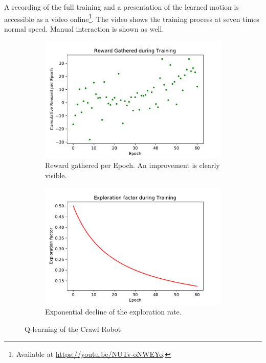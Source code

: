 \documentclass[11pt, a4paper]{article}
\begin{document}
	A recording of the full training and a presentation of the learned motion is accessible as a video online\footnote{Available at \url{https://youtu.be/NUTv-oNWEYo}.}. The video shows the training process at seven times normal speed. Manual interaction is shown as well.
	
	\begin{figure}[H]
		\centering
		\begin{subfigure}{.48\textwidth}
			\centering
			\includegraphics[width=1\linewidth]{images/crawl_rewards}
			\caption{Reward gathered per Epoch. An improvement is clearly visible.}
			\label{fig:crawl_reward}
		\end{subfigure}
		\begin{subfigure}{.48\textwidth}
			\centering
			\includegraphics[width=1\linewidth]{images/crawl_exploration}
			\caption{Exponential decline of the exploration rate.}
			\label{fig:crawl_exploration}
		\end{subfigure}%
		\caption{Q-learning of the Crawl Robot}
		\label{fig:crawl_train}
	\end{figure}
	
\end{document}
